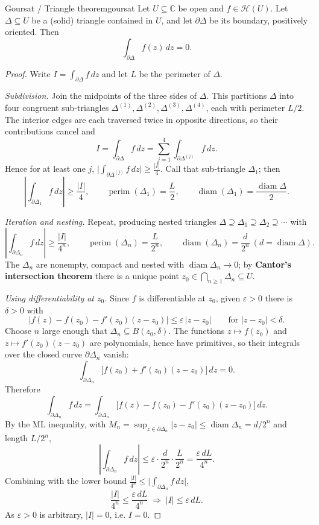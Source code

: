 \documentclass[11pt,openany]{report}
\newcommand{\C}{\mathbb{C}}
\newcommand{\abs}[1]{\left\lvert #1 \right\rvert}
\newcommand{\eps}{\varepsilon}
\newcommand{\Hol}{\mathcal{H}}
\begin{document}
\begin{theorem}{Goursat / Triangle theorem}{goursat}
Let $U\subseteq\C$ be open and $f\in\Hol(U)$. Let $\Delta\subseteq U$ be a (solid) triangle
contained in $U$, and let $\partial\Delta$ be its boundary, positively oriented. Then
\[
  \int_{\partial\Delta} f(z)\,dz = 0 .
\]
\end{theorem}

\begin{proof}
Write $I=\int_{\partial\Delta}f\,dz$ and let $L$ be the perimeter of $\Delta$.

\emph{Subdivision.} Join the midpoints of the three sides of $\Delta$. This partitions
$\Delta$ into four congruent sub-triangles $\Delta^{(1)},\Delta^{(2)},\Delta^{(3)},
\Delta^{(4)}$, each with perimeter $L/2$. The interior edges are each traversed twice in
opposite directions, so their contributions cancel and
\[
  I = \int_{\partial\Delta}f\,dz = \sum_{j=1}^{4}\int_{\partial\Delta^{(j)}}f\,dz .
\]
Hence for at least one $j$,
$\bigl\lvert\int_{\partial\Delta^{(j)}}f\,dz\bigr\rvert\ge\frac{\abs I}{4}$. Call that
sub-triangle $\Delta_1$; then
\[
  \left\lvert\int_{\partial\Delta_1}f\,dz\right\rvert \ge \frac{\abs I}{4},
  \qquad \operatorname{perim}(\Delta_1)=\frac{L}{2},
  \qquad \operatorname{diam}(\Delta_1)=\frac{\operatorname{diam}\Delta}{2}.
\]

\emph{Iteration and nesting.} Repeat, producing nested triangles
$\Delta\supseteq\Delta_1\supseteq\Delta_2\supseteq\cdots$ with
\[
  \left\lvert\int_{\partial\Delta_n}f\,dz\right\rvert \ge \frac{\abs I}{4^n},
  \qquad \operatorname{perim}(\Delta_n)=\frac{L}{2^n},
  \qquad \operatorname{diam}(\Delta_n)=\frac{d}{2^n}\ (d=\operatorname{diam}\Delta).
\]
The $\Delta_n$ are nonempty, compact and nested with $\operatorname{diam}\Delta_n\to0$; by
\textbf{Cantor's intersection theorem} there is a unique point
$z_0\in\bigcap_{n\ge1}\Delta_n\subseteq U$.

\emph{Using differentiability at $z_0$.} Since $f$ is differentiable at $z_0$, given
$\eps>0$ there is $\delta>0$ with
\[
  \bigl\lvert f(z)-f(z_0)-f'(z_0)(z-z_0)\bigr\rvert \le \eps\,\abs{z-z_0}
  \qquad\text{for } \abs{z-z_0}<\delta .
\]
Choose $n$ large enough that $\Delta_n\subseteq B(z_0,\delta)$. The functions
$z\mapsto f(z_0)$ and $z\mapsto f'(z_0)(z-z_0)$ are polynomials, hence have primitives, so
their integrals over the closed curve $\partial\Delta_n$ vanish:
\[
  \int_{\partial\Delta_n}\bigl[f(z_0)+f'(z_0)(z-z_0)\bigr]\,dz = 0 .
\]
Therefore
\[
  \int_{\partial\Delta_n}f\,dz
  = \int_{\partial\Delta_n}\bigl[f(z)-f(z_0)-f'(z_0)(z-z_0)\bigr]\,dz .
\]
By the ML inequality, with $M_n=\sup_{z\in\partial\Delta_n}\abs{z-z_0}\le\operatorname{diam}\Delta_n=d/2^n$
and length $L/2^n$,
\[
  \left\lvert\int_{\partial\Delta_n}f\,dz\right\rvert
  \le \eps\cdot\frac{d}{2^n}\cdot\frac{L}{2^n} = \frac{\eps\,dL}{4^n}.
\]
Combining with the lower bound $\frac{\abs I}{4^n}\le\bigl\lvert\int_{\partial\Delta_n}f\,dz\bigr\rvert$,
\[
  \frac{\abs I}{4^n} \le \frac{\eps\,dL}{4^n}
  \;\Longrightarrow\; \abs I \le \eps\,dL .
\]
As $\eps>0$ is arbitrary, $\abs I=0$, i.e. $I=0$.
\end{proof}
\end{document}
